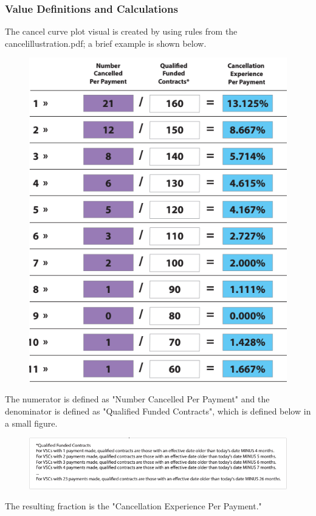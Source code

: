 \documentclass[titlepage]{article}
\begin{document}
\subsubsection{Value Definitions and Calculations}
The cancel curve plot visual is created by using rules from the cancelillustration.pdf; a brief example is shown below.
\begin{figure}[h]
	\centering
	\includegraphics[scale=.3]{./pics/cancel_curve_ex.png}
\end{figure}
The numerator is defined as "Number Cancelled Per Payment" and the denominator is defined as "Qualified Funded Contracts", which is defined below in a small figure. 
\begin{figure}[h]
	\includegraphics[scale=.4]{./pics/cancel_curve_qfc.png}
\end{figure}
The resulting fraction is the "Cancellation Experience Per Payment."
\end{document}
